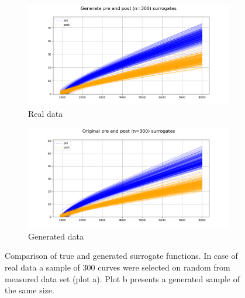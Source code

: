 \begin{figure}[H]
    \centering
\begin{subfigure}[b]{1.\textwidth}
    \centering
    \includegraphics[width=\linewidth]{figures/chapter4/surrogates/p3_gen_sur.png}
 \caption{Real data}
  \end{subfigure}
\begin{subfigure}[b]{1.\textwidth}
    \centering
    \includegraphics[width=\linewidth]{figures/chapter4/surrogates/p3_orig_sur.png}
    \caption{Generated data}
  \end{subfigure}
  \caption[has to be capped]{Comparison of true and generated surrogate functions. In case of real data a sample of 300 curves were selected on random from measured data set (plot a). Plot b presents a generated sample of the same size.}
    \label{plot:model_plotted}
\end{figure}


